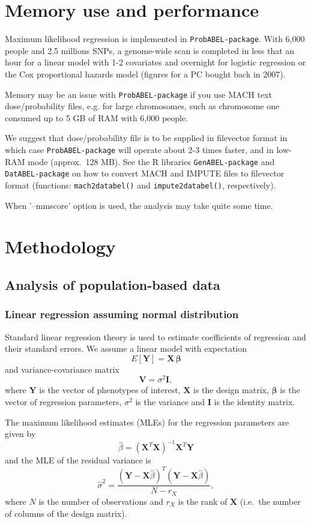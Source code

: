 \documentclass[12pt,a4paper]{article}
\newcommand{\PA}{\texttt{ProbABEL-package}}
\newcommand{\GA}{\texttt{GenABEL-package}}
\newcommand{\DA}{\texttt{DatABEL-package}}
\begin{document}
\section{Memory use and performance}
Maximum likelihood regression is implemented in
\PA{}. With 6,000 people and 2.5 millions SNPs, a
genome-wide scan is completed in less that an hour for a linear model
with 1-2 covariates and overnight for logistic regression or the Cox
proportional hazards model (figures for a PC bought back in 2007).

Memory may be an issue with \PA{} if you use 
MACH text dose/probability files, e.g. for large chromosomes,
such as chromosome one consumed up to 5 GB of RAM with 6,000 people.

We suggest that dose/probability file is to be supplied in filevector format
in which case \PA{} will operate about 2-3 times faster, and
in low-RAM mode (approx.~128 MB). See the R libraries \GA{} and
\DA{} on how to convert MACH and IMPUTE files to
filevector format (functions: \texttt{mach2databel()} and
\texttt{impute2databel()}, respectively).

When '--mmscore' option is used, the analysis may take quite some time. 

\section{Methodology}
\label{sec:methodology}
\subsection{Analysis of population-based data}
\subsubsection{Linear regression assuming normal distribution}
Standard linear regression theory is used to estimate coefficients of
regression and their standard errors. We assume a linear model with
expectation
\begin{equation}
  E[\mathbf{Y}] = \mathbf{X}\, \boldsymbol{\beta}
\label{expectation}
\end{equation}
and variance-covariance matrix
$$
\mathbf{V} = \sigma^2 \mathbf{I},
$$
where $\mathbf{Y}$ is the vector of phenotypes of interest,
$\mathbf{X}$ is the design matrix, $\boldsymbol{\beta}$ is the vector
of regression parameters, $\sigma^2$ is the variance and $\mathbf{I}$
is the identity matrix.

The maximum likelihood estimates (MLEs) for the regression parameters
are given by
\begin{equation}
  \hat{\beta} = (\mathbf{X}^T \mathbf{X})^{-1} \mathbf{X}^T \mathbf{Y}
\end{equation}
and the MLE of the residual variance is
\begin{equation}
  \hat{\sigma}^2 = \frac{(\mathbf{Y} - \mathbf{X}\hat{\beta})^T
    (\mathbf{Y} - \mathbf{X}\hat{\beta})} {N-r_X},
\end{equation}
where $N$ is the number of observations and $r_X$ is the rank of
$\mathbf{X}$ (i.e.~the number of columns of the design matrix).
\end{document}
